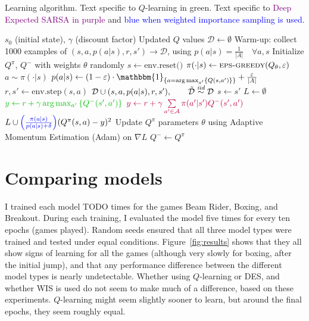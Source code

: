 \documentclass{article}
\begin{document}
\begin{algorithm}
    \caption{Learning algorithm. Text specific to \textcolor{dgreen}{\(Q\)-learning in green}. Text specific to \textcolor{purple}{Deep Expected SARSA in purple} and \textcolor{blue}{blue when weighted importance sampling is used}.}
    \begin{algorithmic}
        \Require $s_0$ (initial state), $\gamma$ (discount factor)
        \Ensure Updated $Q$ values
        \State \(\mathcal{D} \gets \emptyset\)
        \State Warm-up: collect 1000 examples of $(s, a, p(a|s), r, s') \rightarrow \mathcal{D}$, using $p(a|s) = \frac{1}{|A|} \quad \forall a, s$
        \State Initialize $Q^\pi$, $Q^-$ with weights \(\theta\) randomly
            \State $s \gets \text{env.reset()}$
                \State $\pi(\cdot | s) \gets \Call{eps-greedy}{Q_\theta, \eps}$
                \State $a \sim \pi(\cdot|s)$
                \State $p(a|s) \gets (1 - \eps) \cdot \mathbbm{1}_{\set{a = \arg\max_{a'}\set{Q(s,a')}}} + \frac{\eps}{|A|}$
                \State $r, s' \gets \text{env.step}(s, a)$
                \State $\mathcal{D} \cup (s, a, p(a|s), r, s'),\qquad \tilde{\mathcal{D}} \overset{\textit{iid}}{\sim}\mathcal{D}$
                \State $s \gets s'$
                \State $L \gets \emptyset$
                    \State $\textcolor{dgreen}{y \gets r + \gamma \arg\max_{a'}\set{Q^-(s',a')}}$
                    \State $\textcolor{purple}{y \gets r + \gamma \sum\limits_{a' \in \mathcal{A}} \pi(a' | s') Q^-(s', a')}$
                    \State $L \cup \textcolor{blue}{\left( \frac{\pi(a|s)}{p(a|s) + \delta} \right)} (Q^\pi(s, a) - y)^2$ %
                    \EndFor
                \State Update $Q^\pi$ parameters \(\theta\) using Adaptive Momentum Estimation (Adam) on \(\nabla L\)
                    \State $Q^- \gets Q^\pi$
                \EndIf
            \EndWhile
        \EndFor
    \end{algorithmic}
\end{algorithm}

\section{Comparing models}
I trained each model TODO times for the games Beam Rider, Boxing, and Breakout. During each training, I evaluated the model five times for every ten epochs (games played). Random seeds ensured that all three model types were trained and tested under equal conditions. Figure~\ref{fig:results} shows that they all show signs of learning for all the games (although very slowly for boxing, after the initial jump), and that any performance difference between the different model types is nearly undetectable. Whether using \(Q\)-learning or DES, and whether WIS is used do not seem to make much of a difference, based on these experiments. \(Q\)-learning might seem slightly sooner to learn, but around the final epochs, they seem roughly equal.
\end{document}

